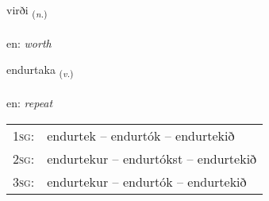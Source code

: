 \documentclass[frontgrid, backgrid]{flacards}\usepackage[]{graphicx}\usepackage[]{color}
\begin{document}
\renewcommand{\flhead}{\vskip5pt \fboxsep=0pt {\small\bfseries\footnotesize Nafnorð | Noun}}
\renewcommand{\fcfoot}{\vskip5pt \fboxsep=0pt \hspace{2pt}{\small\bfseries\footnotesize 2K}}

\renewcommand{\blhead}{\vskip5pt {\small\bfseries\footnotesize Nafnorð | Noun }}
\renewcommand{\bcfoot}{\vskip5pt \hspace{2pt}{\small\bfseries\footnotesize 2K}}


{virði \small{\textsubscript{(\textit{n.})}} \\[1ex] %
\textphonetic{[vɪrðɪ]} \\
en: \emph{worth} \\  [2ex]
\renewcommand*{\arraystretch}{0.8}
}

\renewcommand{\flhead}{\vskip5pt \fboxsep=0pt {\small\bfseries\footnotesize Sagnorð | Verb}}
\renewcommand{\fcfoot}{\vskip5pt \fboxsep=0pt \hspace{2pt}{\small\bfseries\footnotesize 2K}}

\renewcommand{\blhead}{\vskip5pt {\small\bfseries\footnotesize Sagnorð | Verb }}
\renewcommand{\bcfoot}{\vskip5pt \hspace{2pt}{\small\bfseries\footnotesize 2K}}


{endurtaka \small{\textsubscript{(\textit{v.})}} \\[1ex] %
 \\
en: \emph{repeat} \\  [2ex]
\renewcommand*{\arraystretch}{0.8}
\begin{tabular}{p{1cm}l}
\textsc{1sg}: & endurtek -- endurtók -- endurtekið \\ 
\textsc{2sg}: & endurtekur -- endurtókst -- endurtekið \\ 
\textsc{3sg}: & endurtekur -- endurtók -- endurtekið \\ 
\end{tabular}
}
\end{document}
